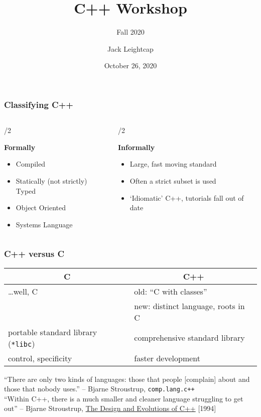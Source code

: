 \documentclass{beamer} \usetheme{Madrid}
\title{C++ Workshop}
\subtitle{Fall 2020}
\author[]{Jack Leightcap\inst{1}\inst{2}}
\institute[IEEE, Wireless Club]{
    \inst{1}IEEE -- \url{nuieeeofficers@gmail.com}
    \and
    \inst{2}Wireless Club -- \url{nuwirelessclub@gmail.com}
}
\date[Fall 2020]{October 26, 2020}
\begin{document}
\frame{\titlepage}

\begin{frame}
    \frametitle{Classifying C++}
    \vfill
    \begin{columns}[t]
        \begin{column}{{\textwidth}/2}
            \begin{center}
                \textbf{Formally}
                \begin{itemize}
                    \item Compiled
                    \item Statically (not strictly) Typed
                    \item Object Oriented
                    \item Systems Language
                \end{itemize}
            \end{center}
        \end{column}
        \begin{column}{{\textwidth}/2}
            \begin{center}
                \textbf{Informally}
            \end{center}
            \begin{itemize}
                \item Large, fast moving standard
                \item Often a strict subset is used
                \item `Idiomatic' C++, tutorials fall out of date
            \end{itemize}
        \end{column}
    \end{columns}
    \vfill
\end{frame}

\begin{frame}
    \frametitle{C++ versus C}
    \vfill
    \begin{table}[]
    \begin{tabular}{l|l}
        \multicolumn{1}{c|}{\textbf{C}} & \multicolumn{1}{c}{\textbf{C++}} \\
        \hline
        \ldots well, C & old: ``C with classes'' \\
                       & new: distinct language, roots in C\\
        portable standard library (\texttt{*libc}) & comprehensive standard library\\
        control, specificity & faster development
    \end{tabular}
    \end{table}
    \begin{center}
    \end{center}
    \vfill
    ``There are only two kinds of languages: those that people [complain] about and those that nobody uses.'' -- Bjarne
    Stroustrup, \texttt{comp.lang.c++}\\[1em]
    ``Within C++, there is a much smaller and cleaner language struggling to get out'' -- Bjarne Stroustrup, \underline{The Design and Evolutions of C++} [1994]
    \vfill
\end{frame}
\end{document}
